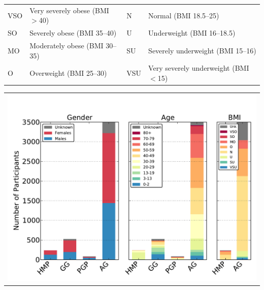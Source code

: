 \documentclass[10pt,letterpaper]{article}
\def\tenpt{\fontfamily{phv}\fontsize{10}{12}\selectfont}
\begin{document}
\begin{framed}
\parbox{0.5\textwidth}{
{\fontsize{7pt}{7pt}\selectfont
\begin{tabular}{ l @{~} l l @{~} l }
VSO & Very severely obese (BMI $>$40) & N & Normal (BMI 18.5--25) \\
SO & Severely obese (BMI 35--40) & U & Underweight (BMI 16--18.5) \\
MO & Moderately obese (BMI 30--35) & SU & Severely underweight (BMI 15--16) \\ 
O & Overweight (BMI 25--30) & VSU & Very severely underweight (BMI $<$15)
\end{tabular}
\vspace{-3mm}
}
}
\hspace{2mm}
\parbox{0.4\textwidth}{
\begin{tabular}{ c }
\includegraphics[trim=0 0 0 1.5cm, clip, scale=0.41]{pdfs-mod1/fig2.pdf}
\end{tabular}
}
\vspace{-4mm}
\label{fig2} 
\end{framed}
\end{document}
